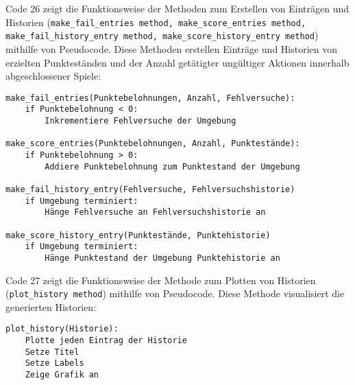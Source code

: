 \begin{minipage}{\linewidth}
Code 26 zeigt die Funktionsweise der Methoden zum Erstellen von Einträgen und Historien (\texttt{make\_fail\_entries method, make\_score\_entries method, make\_fail\_history\_entry method, make\_score\_history\_entry method}) mithilfe von Pseudocode. Diese Methoden erstellen Einträge und Historien von erzielten Punkteständen und der Anzahl getätigter ungültiger Aktionen innerhalb abgeschlossener Spiele:
\vspace{0.5cm}
\begin{lstlisting}[caption={Methoden zum Erstellen von Einträgen für Historien},morekeywords={Punktebelohnungen, Anzahl, Fehlversuche}]
make_fail_entries(Punktebelohnungen, Anzahl, Fehlversuche):
	if Punktebelohnung < 0:
		Inkrementiere Fehlversuche der Umgebung

make_score_entries(Punktebelohnungen, Anzahl, Punktestände):
	if Punktebelohnung > 0:
		Addiere Punktebelohnung zum Punktestand der Umgebung

make_fail_history_entry(Fehlversuche, Fehlversuchshistorie)
	if Umgebung terminiert:
		Hänge Fehlversuche an Fehlversuchshistorie an

make_score_history_entry(Punktestände, Punktehistorie)
	if Umgebung terminiert:
		Hänge Punktestand der Umgebung Punktehistorie an
\end{lstlisting}
\end{minipage}

\begin{minipage}{\linewidth}
Code 27 zeigt die Funktionsweise der Methode zum Plotten von Historien (\texttt{plot\_history method}) mithilfe von Pseudocode. Diese Methode visualisiert die generierten Historien:
\vspace{0.5cm}
\begin{lstlisting}[caption={Methode zum Plotten von Historien},morekeywords={Historien}]
plot_history(Historie):
	Plotte jeden Eintrag der Historie
	Setze Titel
	Setze Labels
	Zeige Grafik an
\end{lstlisting}
\end{minipage}
